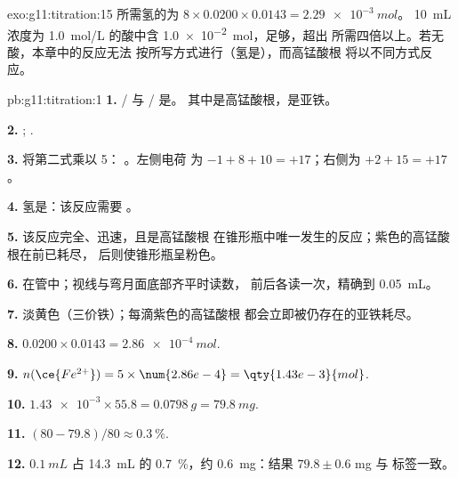 \begin{solution}{exo:g11:titration:15}
所需氢的为 $8 \times 0.0200 \times 0.0143 = \qty{2.29e-3}{mol}$。
\qty{10}{mL} 浓度为 \qty{1.0}{mol/L} 的酸中含 \qty{1.0e-2}{mol}，足够，超出
所需四倍以上。若无酸，本章中的反应无法
按所写方式进行（氢是），而高锰酸根
将以不同方式反应。
\end{solution}

\begin{solution}{pb:g11:titration:1}
\textbf{1.} / 与 / 是。
其中是高锰酸根，是亚铁。

\textbf{2.} ;
.

\textbf{3.} 将第二式乘以 5：
。左侧电荷
为 $-1 + 8 + 10 = +17$；右侧为 $+2 + 15 = +17$。

\textbf{4.} 氢是：该反应需要
。

\textbf{5.} 该反应完全、迅速，且是高锰酸根
在锥形瓶中唯一发生的反应；紫色的高锰酸根在前已耗尽，
后则使锥形瓶呈粉色。

\textbf{6.} 在管中；视线与弯月面底部齐平时读数，
前后各读一次，精确到 \qty{0.05}{mL}。

\textbf{7.} 淡黄色（三价铁）；每滴紫色的高锰酸根
都会立即被仍存在的亚铁耗尽。

\textbf{8.} $0.0200 \times 0.0143 = \qty{2.86e-4}{mol}$.

\textbf{9.} $n(\ce{Fe^{2+}}) = 5 \times \num{2.86e-4} =
\qty{1.43e-3}{mol}$.

\textbf{10.} $\num{1.43e-3} \times 55.8 = \qty{0.0798}{g} =
\qty{79.8}{mg}$.

\textbf{11.} $(80 - 79.8)/80 \approx \qty{0.3}{\percent}$.

\textbf{12.} $\qty{0.1}{mL}$ 占 \qty{14.3}{mL} 的
\qty{0.7}{\percent}，约 \qty{0.6}{mg}：结果 $79.8 \pm 0.6$ mg 与
标签一致。


\end{solution}
